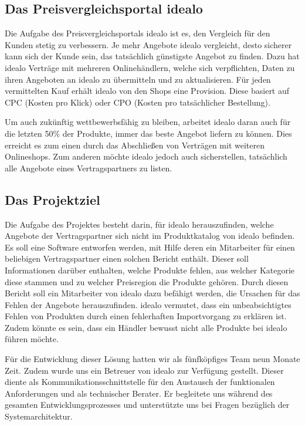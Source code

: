 \subsection{Das Preisvergleichsportal idealo}
\label{subsec:idealo}

Die Aufgabe des Preisvergleichsportals idealo ist es, den Vergleich für den Kunden stetig zu verbessern.
Je mehr Angebote idealo vergleicht, desto sicherer kann sich der Kunde sein, das tatsächlich günstigste Angebot zu
finden.
Dazu hat idealo Verträge mit mehreren Onlinehändlern, welche sich verpflichten, Daten zu ihren Angeboten an idealo zu
übermitteln und zu aktualisieren.
Für jeden vermittelten Kauf erhält idealo von den Shops eine Provision.
Diese basiert auf CPC (Kosten pro Klick) oder CPO (Kosten pro tatsächlicher Bestellung).

Um auch zukünftig wettbewerbsfähig zu bleiben, arbeitet idealo daran auch für die letzten 50\% der Produkte,
immer das beste Angebot liefern zu können.
Dies erreicht es zum einen durch das Abschließen von Verträgen mit weiteren Onlineshops.
Zum anderen möchte idealo jedoch auch sicherstellen, tatsächlich alle Angebote eines Vertragspartners zu listen.

\subsection{Das Projektziel}
\label{subsec:projektziel}

Die Aufgabe des Projektes besteht darin, für idealo herauszufinden, welche Angebote der Vertragspartner sich nicht im
Produktkatalog von idealo befinden.
Es soll eine Software entworfen werden, mit Hilfe deren ein Mitarbeiter für einen beliebigen Vertragspartner einen
solchen Bericht enthält.
Dieser soll Informationen darüber enthalten, welche Produkte fehlen, aus welcher Kategorie diese stammen und zu
welcher Preisregion die Produkte gehören.
Durch diesen Bericht soll ein Mitarbeiter von idealo dazu befähigt werden, die Ursachen für das Fehlen der Angebote
herauszufinden.
idealo vermutet, dass ein unbeabsichtigtes Fehlen von Produkten durch einen fehlerhaften Importvorgang zu erklären ist.
Zudem könnte es sein, dass ein Händler bewusst nicht alle Produkte bei idealo führen möchte.

Für die Entwicklung dieser Lösung hatten wir als fünfköpfiges Team neun Monate Zeit.
Zudem wurde uns ein Betreuer von idealo zur Verfügung gestellt.
Dieser diente als Kommunikationsschnittstelle für den Austausch der funktionalen Anforderungen und als technischer
Berater.
Er begleitete uns während des gesamten Entwicklungsprozesses und unterstützte uns bei Fragen bezüglich der
Systemarchitektur.

